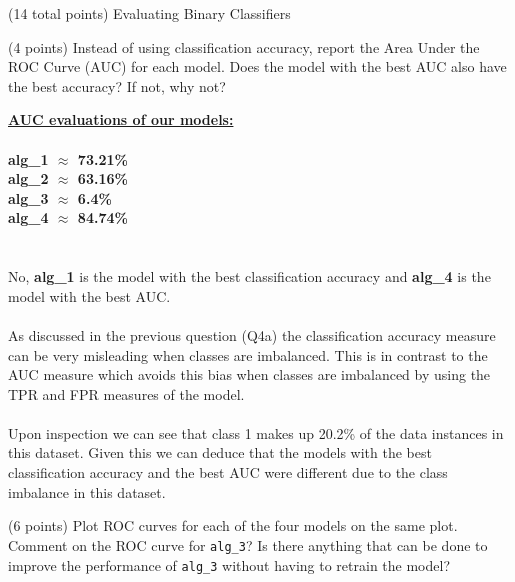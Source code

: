 \documentclass[12pt]{article}
\begin{document}
\begin{question}{(14 total points) Evaluating Binary Classifiers}
\begin{subquestion}
\end{subquestion}



%
%
\begin{subquestion}{(4 points) Instead of using classification accuracy, report the Area Under the ROC Curve (AUC) for each model. 
Does the model with the best AUC also have the best accuracy? If not, why not?\\
}


\begin{answerbox}{27em}
\large{\textbf{\underline{AUC evaluations of our models:}}}\\
\\
\normalsize{\textbf{alg\_1 $\approx$ 73.21\%}}\\
\normalsize{\textbf{alg\_2 $\approx$ 63.16\%}}\\
\normalsize{\textbf{alg\_3 $\approx$ 6.4\%}}\\
\normalsize{\textbf{alg\_4 $\approx$ 84.74\%}}\\
\\
\\
\normalsize{
No, \textbf{alg\_1} is the model with the best classification accuracy and \textbf{alg\_4} is the model with the best AUC.\\
\\
As discussed in the previous question (Q4a) the classification accuracy measure can be very misleading when classes are imbalanced. This is in contrast to the AUC measure which avoids this bias when classes are imbalanced by using the TPR and FPR measures of the model.\\ 
\\
Upon inspection we can see that class 1 makes up 20.2\% of the data instances in this dataset. Given this we can deduce that the models with the best classification accuracy and the best AUC were different due to the class imbalance in this dataset.
}
\end{answerbox}



\end{subquestion}



%
%
\begin{subquestion}{(6 points) Plot ROC curves for each of the four models on the same plot.
Comment on the ROC curve for \texttt{alg\_3}?
Is there anything that can be done to improve the performance of \texttt{alg\_3} without having to retrain the model?\\
}



\end{subquestion}
\end{question}
\end{document}

